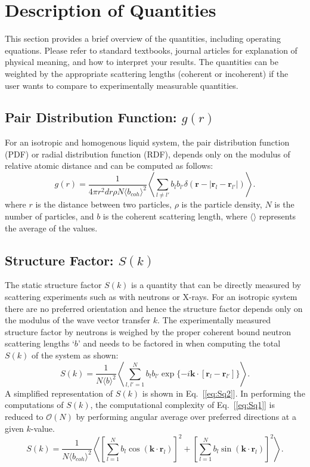 \documentclass{article}
\begin{document}
\section{Description of Quantities}
This section provides a brief overview of the quantities, including operating equations. Please refer to standard textbooks, journal articles for explanation of physical meaning, and how to interpret your results.  The quantities can be weighted by the appropriate scattering lengths (coherent or incoherent) if the user wants to compare to experimentally measurable quantities.

\subsection{Pair Distribution Function: $g(r)$} \label{sec::gofr}
For an isotropic and homogenous liquid system, the pair distribution function (PDF) or radial distribution function (RDF), depends only on the modulus of relative atomic distance and can be computed as follows:
\begin{equation}
g(r) = \frac{1}{4\pi r^2dr\rho N \langle b_{coh}\rangle^2}\left\langle\sum\limits_{l\neq l'} b_lb_{l'}\delta(\mathbf{r}-|\mathbf{r}_l-\mathbf{r}_{l'}|)\right\rangle.
\end{equation}
where $r$ is the distance between two particles, $\rho$ is the particle density, $N$ is the number of particles, and $b$ is the coherent scattering length, where $\langle\rangle$ represents the average of the values.

\subsection{Structure Factor: $S(k)$} \label{sec::sofk}
The static structure factor $S(k)$ is a quantity that can be directly measured by scattering experiments such as with neutrons or X-rays. For an isotropic system there are no preferred orientation and hence the structure factor depends only on the modulus of the wave vector transfer $k$. The experimentally measured structure factor by neutrons is weighed by the proper coherent bound neutron scattering lengths `$b$' and needs to be factored in when computing the total $S(k)$ of the system as shown:
\begin{equation}
\label{eq:Sq1}
S(k) = \frac{1}{N\langle b\rangle^2}\left\langle\sum_{l,l'=1}^{N} b_lb_{l'}\exp{\{-i\mathbf{k}\cdot[\mathbf{r}_l - \mathbf{r}_{l'}]\}}\right\rangle.
\end{equation}
A simplified representation of $S(k)$ is shown in Eq.~[\ref{eq:Sq2}]. In performing the computations of $S(k)$, the computational complexity of Eq.~[\ref{eq:Sq1}] is reduced to $\mathcal{O}(N)$ by performing angular average over preferred directions at a given $k$-value.
\begin{equation}
\label{eq:Sq2}
S(k) = \frac{1}{N\langle b_{coh}\rangle^2}\left\langle\left[\sum_{l=1}^{N} b_l\cos(\mathbf{k}\cdot\mathbf{r}_l)\right]^2+\left[\sum_{l=1}^{N} b_l\sin(\mathbf{k}\cdot\mathbf{r}_l)\right]^2\right\rangle.
\end{equation} 
\end{document}
